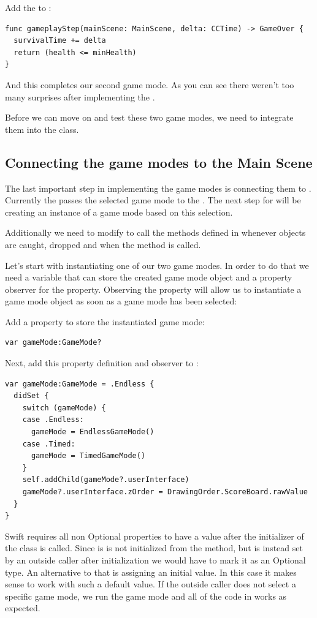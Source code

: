 \begin{leftbar}
Add the  to :
\begin{lstlisting}
func gameplayStep(mainScene: MainScene, delta: CCTime) -> GameOver {
  survivalTime += delta
  return (health <= minHealth)
}
\end{lstlisting}
\end{leftbar}
And this completes our second game mode. As you can see there weren't too many
surprises after implementing the .

Before we can move on and test these two game modes, we need to
integrate them into the  class.

\subsection{Connecting the game modes to the Main Scene}
The last important step in implementing the game modes is connecting them to
. Currently the  passes the
selected game mode to the . The next step for 
 will be creating an instance of a game mode based on this
selection.

Additionally we need to modify  to call the methods
defined in  whenever objects are caught, dropped
and when the  method is called.

Let's start with instantiating one of our two game modes. In order to do that we
need a variable that can store the created game mode object and a property
observer for the  property. Observing the  property
will allow us to instantiate a game mode object as soon as a game mode has been
selected:
\begin{leftbar}
Add a property to store the instantiated game mode:
\begin{lstlisting}
var gameMode:GameMode?
\end{lstlisting}
Next, add this property definition and observer to :
\begin{lstlisting}
var gameMode:GameMode = .Endless {
  didSet {
    switch (gameMode) {
    case .Endless:
      gameMode = EndlessGameMode()
    case .Timed:
      gameMode = TimedGameMode()
    }
    self.addChild(gameMode?.userInterface)
    gameMode?.userInterface.zOrder = DrawingOrder.ScoreBoard.rawValue
  }
}
\end{lstlisting}
\end{leftbar}
Swift requires all non Optional properties to have a value after the
initializer of the class is called. Since  is is not
initialized from the  method, but is instead set by an outside caller after
 initialization we would have to mark it as an Optional type. An alternative to
 that is assigning an initial value. In this case it makes sense to work with
 such a default value. If the outside caller does not select a specific game
 mode, we run the  game mode and all of the code in
  works as expected.

